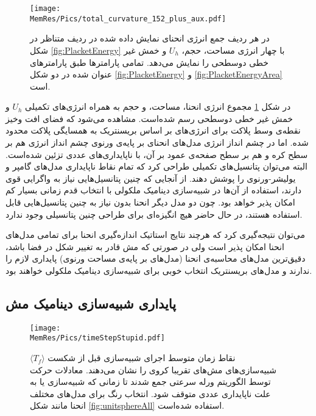 \begin{figure}[htbp]
\begin{center}
\texttt{[image: \\MemRes/Pics/total\_curvature\_152\_plus\_aux.pdf]}
\caption{
در هر ردیف جمع انرژی انحنای نمایش داده شده در ردیف متناظر در  شکل
\ref{fig:PlacketEnergy}
با چهار انرژی مساحت، حجم، 
$U_h$
و خمش غیر خطی دوسطحی را نمایش می‌دهد. تمامی‌ پارامتر‌ها طبق پارامتر‌های عنوان شده در دو شکل 
\ref{fig:PlacketEnergy}
و
\ref{fig:PlacketEnergyArea}
است. 
}
\label{fig:PlacketEnergyAll}
\end{center}
\end{figure}


در شکل 
\ref{fig:PlacketEnergyAll}
مجموع انرژی انحنا، مساحت، و حجم به همراه انرژی‌های تکمیلی 
$U_h$
و خمش غیر خطی دوسطحی رسم شده‌است. مشاهده می‌شود که فضای افت وخیز نقطه‌ی وسط پلاکت برای انرژی‌های بر اساس بریسنتریک به همسایگی پلاکت محدود شده. اما در چشم انداز انرژی مدل‌های انحنای بر پایه‌ی ورنوی چشم انداز انرژی هم بر سطح کره و هم بر سطح صفحه‌ی عمود بر آن، با ناپایداری‌های عددی تزئین شده‌است. البته می‌توان پتانسیل‌های تکمیلی طراحی کرد که تمام نقاط ناپایداری مدل‌های گامپر و یولیشر-ورنوی را پوشش دهند. از آنجایی که چنین پتانسیل‌هایی نیاز به واگرایی قوی دارند، استفاده از آن‌ها در شبیه‌سازی دینامیک ملکولی با انتخاب قدم زمانی بسیار کم امکان پذیر خواهد بود. چون دو مدل دیگر انحنا بدون نیاز به چنین پتانسیل‌هایی قابل استفاده هستند، در حال حاضر هیچ انگیزه‌ای برای طراحی چنین پتانسیلی وجود ندارد.

می‌توان نتیجه‌گیری کرد که هرچند نتایج استاتیک اندازه‌گیری انحنا برای تمامی‌ مدل‌های انحنا امکان پذیر است ولی در صورتی که مش قادر به تغییر شکل در فضا باشد، دقیق‌ترین مدل‌های محاسبه‌ی انحنا (مدل‌های بر پایه‌ی مساحت ورنوی) پایداری لازم را ندارند و مدل‌های بریسنتریک انتخاب خوبی برای شبیه‌سازی دینامیک ملکولی خواهند بود.









\subsection{\label{sec:ResultsStability}
پایداری شبیه‌سازی دینامیک مش
}

\begin{figure}[tbp]
\begin{center}
\texttt{[image: \\MemRes/Pics/timeStepStupid.pdf]}
\caption{
نقاط زمان متوسط اجرای شبیه‌سازی قبل از شکست
$\langle T_f\rangle$
شبیه‌سازی‌های مش‌های تقریبا کروی را نشان می‌دهند. معادلات حرکت توسط الگوریتم ورله سرعتی جمع شدند تا زمانی که شبیه‌سازی یا به علت ناپایداری عددی متوقف شود. انتخاب رنگ برای مدل‌های مختلف انحنا مانند شکل
\ref{fig:unitsphereAll}
استفاده شده‌است.
}
\label{fig:timeSteps}
\end{center}
\end{figure}


